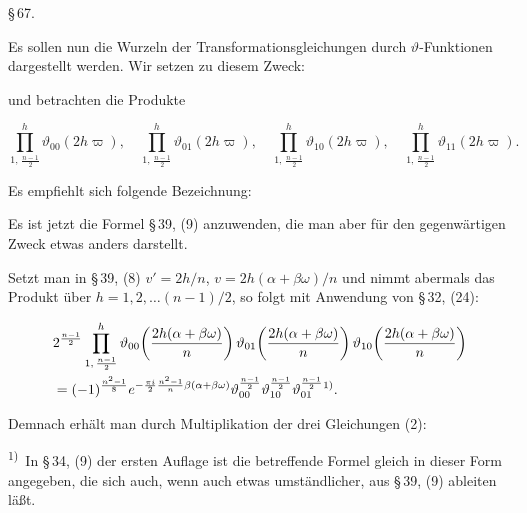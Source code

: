 \begin{center}
\S\,67. \textbf{}
\end{center}

Es sollen nun die Wurzeln der Transformationsgleichungen durch $\vartheta$-Funktionen dargestellt werden. Wir setzen zu diesem Zweck:


und betrachten die Produkte

\[
\prod_{1,\,\frac{n-1}{2}}^{h} \vartheta_{00}(2h\varpi), \quad
\prod_{1,\,\frac{n-1}{2}}^{h} \vartheta_{01}(2h\varpi), \quad
\prod_{1,\,\frac{n-1}{2}}^{h} \vartheta_{10}(2h\varpi), \quad
\prod_{1,\,\frac{n-1}{2}}^{h} \vartheta_{11}(2h\varpi).
\]

Es empfiehlt sich folgende Bezeichnung:


Es ist jetzt die Formel \S\,39, (9) anzuwenden, die man aber für den gegenwärtigen Zweck etwas anders darstellt.

Setzt man in \S\,39, (8) $v' = 2h/n$, $v = 2h(\alpha+\beta\omega)/n$ und nimmt abermals das Produkt über $h = 1, 2, \ldots (n-1)/2$, so folgt mit Anwendung von \S\,32, (24):

\[
\begin{aligned}
&2^{\frac{n-1}{2}} \prod_{1,\,\frac{n-1}{2}}^{h} \vartheta_{00}\!\left(\frac{2h(\alpha+\beta\omega)}{n}\right) \vartheta_{01}\!\left(\frac{2h(\alpha+\beta\omega)}{n}\right) \vartheta_{10}\!\left(\frac{2h(\alpha+\beta\omega)}{n}\right)\\
&= (-1)^{\frac{n^2-1}{8}} e^{-\frac{\pi i}{2}\frac{n^2-1}{n}\beta(\alpha+\beta\omega)} \vartheta_{00}^{\frac{n-1}{2}} \vartheta_{10}^{\frac{n-1}{2}} \vartheta_{01}^{\frac{n-1}{2}}\textsuperscript{1)}.
\end{aligned}
\]

Demnach erhält man durch Multiplikation der drei Gleichungen (2):


\textsuperscript{1)}~In \S\,34, (9) der ersten Auflage ist die betreffende Formel gleich in dieser Form angegeben, die sich auch, wenn auch etwas umständlicher, aus \S\,39, (9) ableiten läßt.
